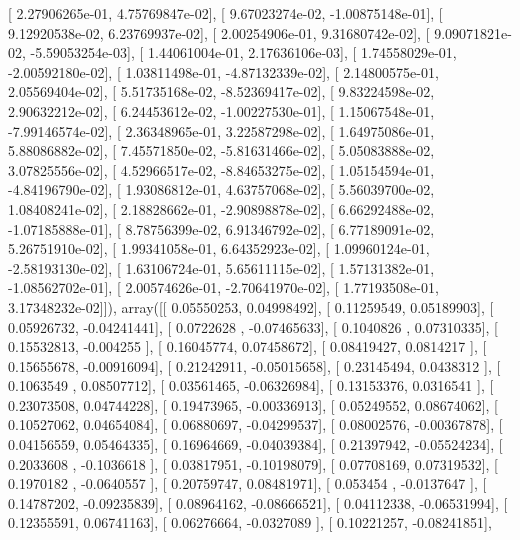 \documentclass{article}
\begin{document}
       [  2.27906265e-01,   4.75769847e-02],
       [  9.67023274e-02,  -1.00875148e-01],
       [  9.12920538e-02,   6.23769937e-02],
       [  2.00254906e-01,   9.31680742e-02],
       [  9.09071821e-02,  -5.59053254e-03],
       [  1.44061004e-01,   2.17636106e-03],
       [  1.74558029e-01,  -2.00592180e-02],
       [  1.03811498e-01,  -4.87132339e-02],
       [  2.14800575e-01,   2.05569404e-02],
       [  5.51735168e-02,  -8.52369417e-02],
       [  9.83224598e-02,   2.90632212e-02],
       [  6.24453612e-02,  -1.00227530e-01],
       [  1.15067548e-01,  -7.99146574e-02],
       [  2.36348965e-01,   3.22587298e-02],
       [  1.64975086e-01,   5.88086882e-02],
       [  7.45571850e-02,  -5.81631466e-02],
       [  5.05083888e-02,   3.07825556e-02],
       [  4.52966517e-02,  -8.84653275e-02],
       [  1.05154594e-01,  -4.84196790e-02],
       [  1.93086812e-01,   4.63757068e-02],
       [  5.56039700e-02,   1.08408241e-02],
       [  2.18828662e-01,  -2.90898878e-02],
       [  6.66292488e-02,  -1.07185888e-01],
       [  8.78756399e-02,   6.91346792e-02],
       [  6.77189091e-02,   5.26751910e-02],
       [  1.99341058e-01,   6.64352923e-02],
       [  1.09960124e-01,  -2.58193130e-02],
       [  1.63106724e-01,   5.65611115e-02],
       [  1.57131382e-01,  -1.08562702e-01],
       [  2.00574626e-01,  -2.70641970e-02],
       [  1.77193508e-01,   3.17348232e-02]]), array([[ 0.05550253,  0.04998492],
       [ 0.11259549,  0.05189903],
       [ 0.05926732, -0.04241441],
       [ 0.0722628 , -0.07465633],
       [ 0.1040826 ,  0.07310335],
       [ 0.15532813, -0.004255  ],
       [ 0.16045774,  0.07458672],
       [ 0.08419427,  0.0814217 ],
       [ 0.15655678, -0.00916094],
       [ 0.21242911, -0.05015658],
       [ 0.23145494,  0.0438312 ],
       [ 0.1063549 ,  0.08507712],
       [ 0.03561465, -0.06326984],
       [ 0.13153376,  0.0316541 ],
       [ 0.23073508,  0.04744228],
       [ 0.19473965, -0.00336913],
       [ 0.05249552,  0.08674062],
       [ 0.10527062,  0.04654084],
       [ 0.06880697, -0.04299537],
       [ 0.08002576, -0.00367878],
       [ 0.04156559,  0.05464335],
       [ 0.16964669, -0.04039384],
       [ 0.21397942, -0.05524234],
       [ 0.2033608 , -0.1036618 ],
       [ 0.03817951, -0.10198079],
       [ 0.07708169,  0.07319532],
       [ 0.1970182 , -0.0640557 ],
       [ 0.20759747,  0.08481971],
       [ 0.053454  , -0.0137647 ],
       [ 0.14787202, -0.09235839],
       [ 0.08964162, -0.08666521],
       [ 0.04112338, -0.06531994],
       [ 0.12355591,  0.06741163],
       [ 0.06276664, -0.0327089 ],
       [ 0.10221257, -0.08241851],
\end{document}
